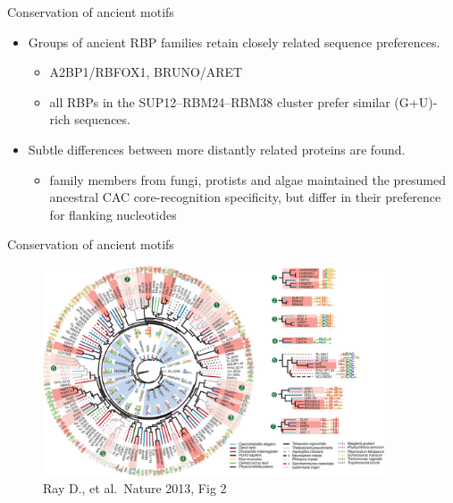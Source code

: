 \documentclass[professionalfont, 12pt, default]{beamer}
\providecommand{\tightlist}{%
    \setlength{\itemsep}{0pt}\setlength{\parskip}{0pt}}
\begin{document}
\begin{frame}{%
\protect\hypertarget{conservation-of-ancient-motifs}{%
Conservation of ancient motifs}}

\begin{itemize}
\tightlist
\item
  Groups of ancient RBP families retain closely related sequence
  preferences.

  \begin{itemize}
  \tightlist
  \item
    A2BP1/RBFOX1, BRUNO/ARET
  \item
    all RBPs in the SUP12–RBM24–RBM38 cluster prefer similar (G+U)-rich
    sequences.
  \end{itemize}
\item
  Subtle differences between more distantly related proteins are found.

  \begin{itemize}
  \tightlist
  \item
    family members from fungi, protists and algae maintained the
    presumed ancestral CAC core-recognition specificity, but differ in
    their preference for flanking nucleotides
  \end{itemize}
\end{itemize}

\end{frame}

\begin{frame}{%
\protect\hypertarget{conservation-of-ancient-motifs-1}{%
Conservation of ancient motifs}}

\begin{figure}
\centering
\includegraphics[width=0.9\textwidth,height=\textheight]{img/f2.jpg}
\caption{Ray D., et al.~Nature 2013, Fig 2}
\end{figure}

\end{frame}
\end{document}
